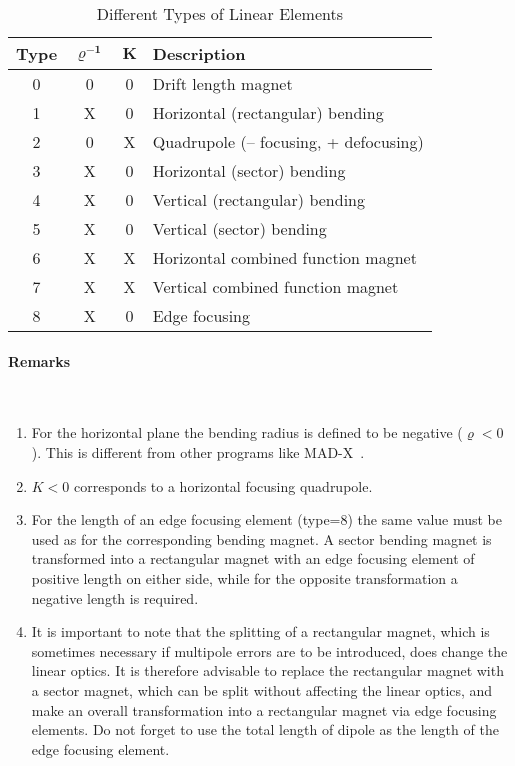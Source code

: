\begin{table}[h]
    \caption{Different Types of Linear Elements}
    \label{T-LinEle}
    \centering
    \renewcommand{\arraystretch}{1.5}
    \begin{tabular}{|c|c|c|l|}
        \hline
        \rowcolor{blue!30}
        \textbf{Type} & $\mathbf{\varrho^{-1}}$ & $\mathbf{K}$ & \textbf{Description} \\
        \hline
        0 & 0 & 0 & Drift length magnet \\
        \hline
        1 & X & 0 & Horizontal (rectangular) bending \\
        \hline
        2 & 0 & X & Quadrupole (-- focusing, + defocusing) \\
        \hline
        3 & X & 0 & Horizontal (sector) bending \\
        \hline
        4 & X & 0 & Vertical (rectangular) bending \\
        \hline
        5 & X & 0 & Vertical (sector) bending \\
        \hline
        6 & X & X & Horizontal combined function magnet \\
        \hline
        7 & X & X & Vertical combined function magnet \\
        \hline
        8 & X & 0 & Edge focusing \\
        \hline
    \end{tabular}
\end{table}

\paragraph{Remarks}~
\begin{enumerate}
    \item For the horizontal plane the bending radius is defined to be negative \mbox{($\varrho < 0$).} This is different from other programs like MAD-X~\cite{MAD}.
    \item $K < 0 $ corresponds to a horizontal focusing quadrupole.
    \item For the length of an edge focusing element (type=8) the same value must be used as for the corresponding bending magnet. A sector bending magnet is transformed into a rectangular magnet with an edge focusing element of positive length on either side, while for the opposite transformation a negative length is required.
    \item It is important to note that the splitting of a rectangular magnet, which is sometimes necessary if multipole errors are to be introduced, does change the linear optics. It is therefore advisable to replace the rectangular magnet with a sector magnet, which can be split without affecting the linear optics, and make an overall transformation into a rectangular magnet via edge focusing elements. Do not forget to use the total length of dipole as the length of the edge focusing element.
\end{enumerate}


